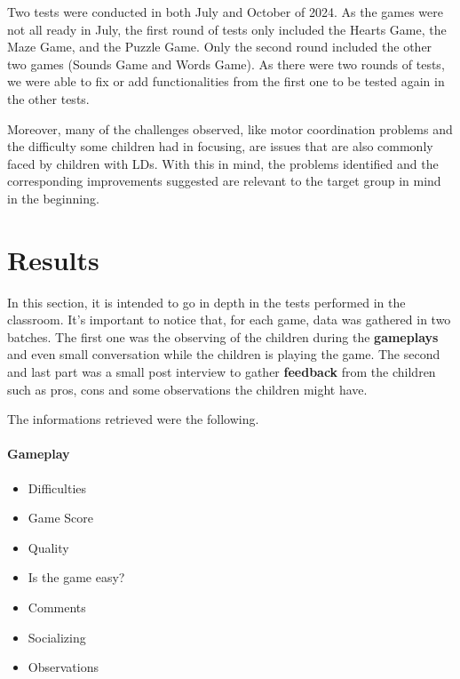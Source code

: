 Two tests were conducted in both July and October of 2024. As the games were not all ready in July, the first round of tests only included the Hearts Game, the Maze Game, and the Puzzle Game. Only the second round included the other two games (Sounds Game and Words Game). As there were two rounds of tests, we were able to fix or add functionalities from the first one to be tested again in the other tests.

Moreover, many of the challenges observed, like motor coordination problems and the difficulty some children had in focusing, are issues that are also commonly faced by children with LDs. With this in mind, the problems identified and the corresponding improvements suggested are relevant to the target group in mind in the beginning.

\newpage
\section{Results}

In this section, it is intended to go in depth in the tests performed in the classroom. It's important to notice that, for each game, data was gathered in two batches. The first one was the observing of the children during the \textbf{gameplays} and even small conversation while the children is playing the game. The second and last part was a small post interview to gather \textbf{feedback} from the children such as pros, cons and some observations the children might have.

The informations retrieved were the following.

\paragraph{Gameplay}
\begin{itemize}
    \item Difficulties
    \item Game Score
    \item Quality
    \item Is the game easy?
    \item Comments
    \item Socializing
    \item Observations
\end{itemize}

